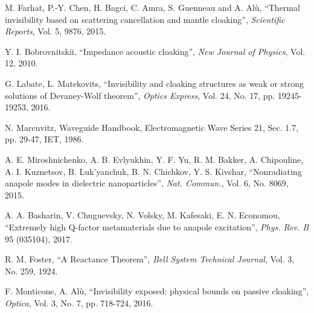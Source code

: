 \documentclass[reprint, showpacs, amsmath,amssymb, aps,
prb]{revtex4-1}
\begin{document}
\begin{thebibliography}{99}
M. Farhat, P.-Y. Chen, H. Bagci, C. Amra, S. Guenneau and A. Alù, ``Thermal invisibility based on scattering cancellation and mantle cloaking'', {\em Scientific Reports}, Vol.   5, 9876,  2015.

Y. I. Bobrovnitskii, ``Impedance acoustic cloaking'', {\em New Journal of Physics}, Vol. 12, 2010.

G. Labate, L. Matekovits, ``Invisibility and cloaking structures as weak or strong solutions of Devaney-Wolf theorem'', {\em Optics Express}, Vol. 24, No. 17, pp. 19245-19253, 2016.




N. Marcuvitz, Waveguide Handbook, Electromagnetic Wave Series 21, Sec. 1.7, pp. 29-47, IET, 1986.

A. E. Miroshnichenko, A. B. Evlyukhin, Y. F. Yu, R. M. Bakker, A. Chipouline, A. I. Kuznetsov, B. Luk’yanchuk, B. N. Chichkov,  Y. S. Kivshar, ``Nonradiating anapole modes in dielectric nanoparticles'', {\em Nat. Commun.},  Vol. 6, No. 8069, 2015.

A. A. Basharin, V. Chuguevsky, N. Volsky, M. Kafesaki, E. N. Economou,  ``Extremely high Q-factor metamaterials due to anapole excitation'', {\em Phys. Rev. B} 95 (035104), 2017.


R. M. Foster, ``A Reactance Theorem'', {\em Bell System Technical Journal}, Vol. 3, No. 259, 1924.

F. Monticone, A. Alù, ``Invisibility exposed: physical bounds on passive cloaking'', {\em Optica},  Vol. 3, No. 7, pp. 718-724, 2016. 




\end{thebibliography}
\end{document}
